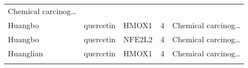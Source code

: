 \documentclass[
]{article}
\begin{document}
\begin{longtable}[]{@{}lllll@{}}
\begin{minipage}[t]{0.21\columnwidth}
Chemical carcinog\ldots{}\strut
\end{minipage}\tabularnewline
\begin{minipage}[t]{0.17\columnwidth}\raggedright
Huangbo\strut
\end{minipage} & \begin{minipage}[t]{0.16\columnwidth}\raggedright
quercetin\strut
\end{minipage} & \begin{minipage}[t]{0.12\columnwidth}\raggedright
HMOX1\strut
\end{minipage} & \begin{minipage}[t]{0.19\columnwidth}\raggedright
4\strut
\end{minipage} & \begin{minipage}[t]{0.21\columnwidth}\raggedright
Chemical carcinog\ldots{}\strut
\end{minipage}\tabularnewline
\begin{minipage}[t]{0.17\columnwidth}\raggedright
Huangbo\strut
\end{minipage} & \begin{minipage}[t]{0.16\columnwidth}\raggedright
quercetin\strut
\end{minipage} & \begin{minipage}[t]{0.12\columnwidth}\raggedright
NFE2L2\strut
\end{minipage} & \begin{minipage}[t]{0.19\columnwidth}\raggedright
4\strut
\end{minipage} & \begin{minipage}[t]{0.21\columnwidth}\raggedright
Chemical carcinog\ldots{}\strut
\end{minipage}\tabularnewline
\begin{minipage}[t]{0.17\columnwidth}\raggedright
Huanglian\strut
\end{minipage} & \begin{minipage}[t]{0.16\columnwidth}\raggedright
quercetin\strut
\end{minipage} & \begin{minipage}[t]{0.12\columnwidth}\raggedright
HMOX1\strut
\end{minipage} & \begin{minipage}[t]{0.19\columnwidth}\raggedright
4\strut
\end{minipage} & \begin{minipage}[t]{0.21\columnwidth}\raggedright
Chemical carcinog\ldots{}\strut
\end{minipage}\tabularnewline
\begin{minipage}[t]{0.17\columnwidth}\raggedright

\end{minipage}
\end{longtable}
\end{document}
